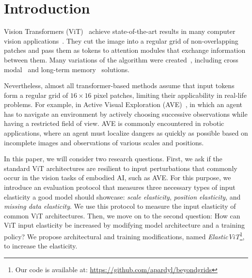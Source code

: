 \documentclass[10pt,twocolumn,letterpaper]{article}
\begin{document}


\section{Introduction}

Vision Transformers (ViT)~\cite{dosovitskiy2020vit} achieve state-of-the-art results in many computer vision applications~\cite{carion2020endtoend,yu2022coca,kirillov2023segany}. They cut the image into a regular grid of non-overlapping patches and pass them as tokens to attention modules that exchange information between them. Many variations of the algorithm were created~\cite{chen2021asvit,rao2021dynamicvit,tang2022patch,yin2022avit}, including cross modal~\cite{akbari2021vatt} and long-term memory~\cite{wu2022memvit} solutions.

Nevertheless, almost all transformer-based methods assume that input tokens form a regular grid of $16 \times 16$ pixel patches, limiting their applicability in real-life problems. For example, in Active Visual Exploration (AVE)~\cite{pardyl2023active}, in which an agent has to navigate an environment by actively choosing successive observations while having a restricted field of view. AVE is commonly encountered in robotic applications, where an agent must localize dangers as quickly as possible based on incomplete images and observations of various scales and positions.



In this paper, we will consider two research questions. First, we ask if the standard ViT architectures are resilient to input perturbations that commonly occur in the vision tasks of embodied AI, such as AVE. For this purpose, we introduce an evaluation protocol that measures three necessary types of input elasticity a good model should showcase: \textit{scale elasticity}, \textit{position elasticity}, and \textit{missing data elasticity}.
We use this protocol to measure the input elasticity of common ViT architectures. Then, we move on to the second question: How can ViT input elasticity be increased by modifying model architecture and a training policy? We propose architectural and training modifications, named \textit{ElasticViT}\footnote{Our code is available at: \url{https://github.com/apardyl/beyondgrids}}, to increase the elasticity.


\end{document}
